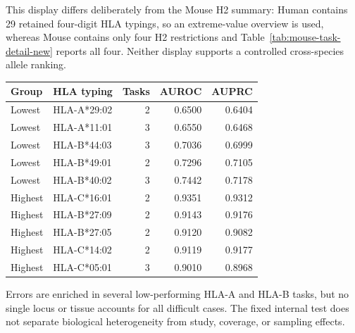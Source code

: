 This display differs deliberately from the Mouse H2 summary: Human contains 29 retained four-digit HLA typings, so an extreme-value overview is used, whereas Mouse contains only four H2 restrictions and Table~\ref{tab:mouse-task-detail-new} reports all four. Neither display supports a controlled cross-species allele ranking.

\begin{center}
\begin{minipage}{\columnwidth}
\label{tab:human-hla-locus}
\centering
\scriptsize
\begin{tabularx}{\columnwidth}{lXrrr}
\toprule
Group & HLA typing & Tasks & AUROC & AUPRC \\
\midrule
Lowest & HLA-A*29:02 & 2 & 0.6500 & 0.6404 \\
Lowest & HLA-A*11:01 & 3 & 0.6550 & 0.6468 \\
Lowest & HLA-B*44:03 & 3 & 0.7036 & 0.6999 \\
Lowest & HLA-B*49:01 & 2 & 0.7296 & 0.7105 \\
Lowest & HLA-B*40:02 & 3 & 0.7442 & 0.7178 \\
\midrule
Highest & HLA-C*16:01 & 2 & 0.9351 & 0.9312 \\
Highest & HLA-B*27:09 & 2 & 0.9143 & 0.9176 \\
Highest & HLA-B*27:05 & 2 & 0.9120 & 0.9082 \\
Highest & HLA-C*14:02 & 2 & 0.9119 & 0.9177 \\
Highest & HLA-C*05:01 & 3 & 0.9010 & 0.8968 \\
\bottomrule
\end{tabularx}
\end{minipage}
\end{center}

Errors are enriched in several low-performing HLA-A and HLA-B tasks, but no single locus or tissue accounts for all difficult cases. The fixed internal test does not separate biological heterogeneity from study, coverage, or sampling effects.
